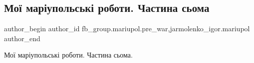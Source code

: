  
 
 
 
 

\subsection{Мої маріупольські роботи. Частина сьома}
\label{sec:12_02_2023.fb.fb_group.mariupol.pre_war.4.mo__mar_upolsk__robo}
 
\ifcmt
 author_begin
   author_id fb_group.mariupol.pre_war,jarmolenko_igor.mariupol
 author_end
\fi

Мої маріупольські роботи. Частина сьома.

